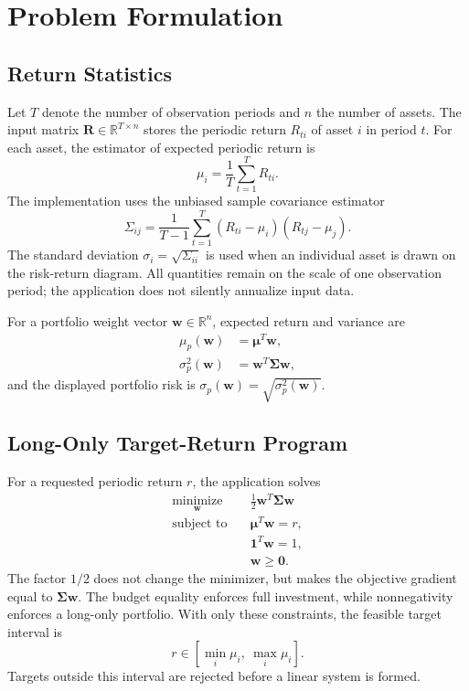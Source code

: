 \documentclass[conference]{IEEEtran}
\newcommand{\vect}[1]{\boldsymbol{#1}}
\newcommand{\mat}[1]{\boldsymbol{#1}}
\begin{document}
\section{Problem Formulation}

\subsection{Return Statistics}

Let $T$ denote the number of observation periods and $n$ the number of assets.
The input matrix $\mat{R}\in\mathbb{R}^{T\times n}$ stores the periodic return
$R_{ti}$ of asset $i$ in period $t$. For each asset, the estimator of expected
periodic return is
\begin{equation}
    \mu_i = \frac{1}{T}\sum_{t=1}^{T} R_{ti}.
    \label{eq:mean}
\end{equation}
The implementation uses the unbiased sample covariance estimator
\begin{equation}
    \Sigma_{ij} = \frac{1}{T-1}\sum_{t=1}^{T}
    (R_{ti}-\mu_i)(R_{tj}-\mu_j).
    \label{eq:covariance}
\end{equation}
The standard deviation $\sigma_i=\sqrt{\Sigma_{ii}}$ is used when an individual
asset is drawn on the risk-return diagram. All quantities remain on the scale
of one observation period; the application does not silently annualize input
data.

For a portfolio weight vector $\vect{w}\in\mathbb{R}^{n}$, expected return and
variance are
\begin{align}
    \mu_p(\vect{w}) &= \vect{\mu}^{T}\vect{w}, \\
    \sigma_p^2(\vect{w}) &= \vect{w}^{T}\mat{\Sigma}\vect{w},
    \label{eq:metrics}
\end{align}
and the displayed portfolio risk is
$\sigma_p(\vect{w})=\sqrt{\sigma_p^2(\vect{w})}$.

\subsection{Long-Only Target-Return Program}

For a requested periodic return $r$, the application solves
\begin{align}
 \underset{\vect{w}}{\operatorname{minimize}}\quad
     & \frac{1}{2}\vect{w}^{T}\mat{\Sigma}\vect{w}
       \label{eq:qp}\\
 \operatorname{subject\ to}\quad
     & \vect{\mu}^{T}\vect{w}=r, \nonumber\\
     & \vect{1}^{T}\vect{w}=1, \nonumber\\
     & \vect{w}\geq \vect{0}. \nonumber
\end{align}
The factor $1/2$ does not change the minimizer, but makes the objective
gradient equal to $\mat{\Sigma}\vect{w}$. The budget equality enforces full
investment, while nonnegativity enforces a long-only portfolio. With only
these constraints, the feasible target interval is
\begin{equation}
    r\in\left[\min_i\mu_i,\ \max_i\mu_i\right].
    \label{eq:feasible-range}
\end{equation}
Targets outside this interval are rejected before a linear system is formed.
\end{document}

